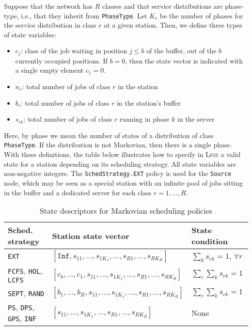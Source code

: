 Suppose that the network has $R$ classes and that service distributions are phase-type, i.e., that they inherit from \texttt{PhaseType}. Let $K_{r}$ be the number of phases for the service distribution in class $r$ at a given station. Then, we define three types of state variables:
\begin{itemize}
\item $c_j$: class of the job waiting in position $j\leq b$ of the buffer, out of the $b$ currently occupied positions. If $b=0$, then the state vector is indicated with a single empty element $c_1=0$.
\item $n_r$: total number of jobs of class $r$ in the station
\item $b_r$: total number of jobs of class $r$ in the station's buffer
\item $s_{rk}$: total number of jobs of class $r$ running in phase $k$ in the server
\end{itemize}
Here, by phase we mean the number of states of a distribution of class \texttt{PhaseType}. If the distribution is not Markovian, then there is a  single phase.
With these definitions, the table below illustrates how to specify in \textsc{Line} a valid state for a station depending on its scheduling strategy. All state variables are non-negative integers. The \texttt{SchedStrategy.EXT} policy is used for the \texttt{Source} node, which may be seen as a special station with an infinite pool of jobs sitting in the buffer and a dedicated server for each class $r=1,...,R$.
\begin{table}[thbp]
\renewcommand{\arraystretch}{1.2}
\centering
\caption{State descriptors for Markovian scheduling policies}
\begin{tabular}{|l|l|l|}
\hline
\textbf{Sched. strategy} & \textbf{Station state vector} & \textbf{State condition}\\
\hline
\texttt{EXT} & $[\texttt{Inf},s_{11},...,s_{1K_1},...,s_{R1},...,s_{RK_R}]$ & $\sum_k s_{rk}=1$, $\forall r$\\
\hline
\texttt{FCFS}, \texttt{HOL}, \texttt{LCFS} &   $[c_{b},...,c_{1},s_{11},...,s_{1K_1},...,s_{R1},...,s_{RK_R}]$& $\sum_{r}\sum_{k} s_{rk}=1$\\
\hline
\texttt{SEPT}, \texttt{RAND} &   $[b_{1},...,b_{R},s_{11},...,s_{1K_1},...,s_{R1},...,s_{RK_R}]$& $\sum_{r}\sum_{k} s_{rk}=1$\\
\hline
\texttt{PS}, \texttt{DPS}, \texttt{GPS}, \texttt{INF}	&   $[s_{11},...,s_{1K_1},...,s_{R1},...,s_{RK_R}]$& None\\
\hline
\end{tabular}
\label{TAB_state_policies}
\end{table}

